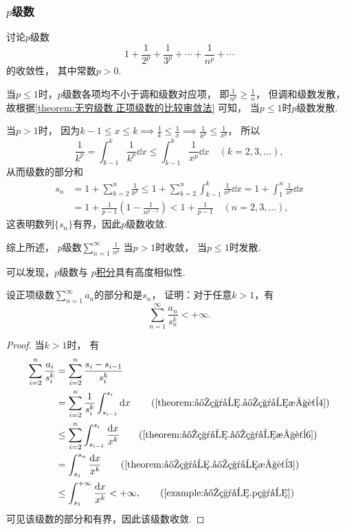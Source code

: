 \subsubsection{\texorpdfstring{\(p\)}{p}级数}
\begin{proposition}\label{example:无穷级数.p级数的收敛性}
讨论\(p\)级数\[
	1+\frac{1}{2^p}+\frac{1}{3^p}+\dotsb+\frac{1}{n^p}+\dotsb
\]的收敛性，
其中常数\(p>0\).
\begin{solution}
当\(p \leq 1\)时，\(p\)级数各项均不小于调和级数对应项，
即\(\frac{1}{n^p} \geq \frac{1}{n}\)，
但调和级数发散，
故根据\cref{theorem:无穷级数.正项级数的比较审敛法} 可知，
当\(p \leq 1\)时\(p\)级数发散.

当\(p > 1\)时，
因为\(k-1
\leq x
\leq k \implies \frac{1}{k}
\leq \frac{1}{x} \implies \frac{1}{k^p}
\leq \frac{1}{x^p}\)，
所以\[
	\frac{1}{k^p}
	= \int_{k-1}^k \frac{1}{k^p} \dd{x}
	\leq \int_{k-1}^k \frac{1}{x^p} \dd{x}
	\quad(k=2,3,\dotsc),
\]
从而级数的部分和
\begin{align*}
	s_n &= 1 + \sum_{k=2}^n{\frac{1}{k^p}}
	\leq 1 + \sum_{k=2}^n{ \int_{k-1}^k{\frac{1}{x^p}\dd{x}} }
	= 1 + \int_1^n{\frac{1}{x^p}\dd{x}} \\
	&= 1 + \frac{1}{p-1}\left(1-\frac{1}{n^{p-1}}\right)
	< 1 + \frac{1}{p-1}
	\quad(n=2,3,\dotsc),
\end{align*}
这表明数列\(\{s_n\}\)有界，因此\(p\)级数收敛.

综上所述，{\color{red} \(p\)级数\(\sum_{n=1}^\infty \frac{1}{n^p}\)
当\(p > 1\)时收敛，
当\(p \leq 1\)时发散.}
\end{solution}
\end{proposition}
可以发现，\(p\)级数与
\hyperref[example:定积分.p积分]{\(p\)积分}具有高度相似性.

\begin{example}
设正项级数\(\sum_{n=1}^\infty a_n\)的部分和是\(s_n\)，
证明：对于任意\(k>1\)，有\[
	\sum_{n=1}^\infty \frac{a_n}{s_n^k} < +\infty.
\]
\begin{proof}
当\(k>1\)时，
有\begin{align*}
	\sum_{i=2}^n \frac{a_i}{s_i^k}
	&= \sum_{i=2}^n \frac{s_i-s_{i-1}}{s_i^k} \\
	&= \sum_{i=2}^n \frac{1}{s_i^k} \int_{s_{i-1}}^{s_i} \dd{x}
			\tag{\cref{theorem:定积分.定积分性质4}} \\
	&\leq \sum_{i=2}^n \int_{s_{i-1}}^{s_i} \frac{\dd{x}}{x^k}
			\tag{\cref{theorem:定积分.定积分性质6}} \\
	&= \int_{s_1}^{s_n} \frac{\dd{x}}{x^k}
			\tag{\cref{theorem:定积分.定积分性质3}} \\
	&\leq \int_{s_1}^{+\infty} \frac{\dd{x}}{x^k}
	< +\infty,
			\tag{\cref{example:定积分.p积分}}
\end{align*}
可见该级数的部分和有界，因此该级数收敛.
\end{proof}
\end{example}

